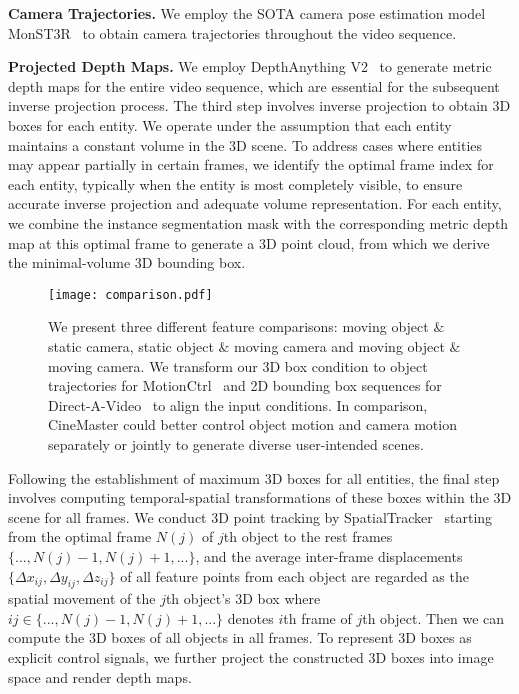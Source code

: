 \noindent\textbf{Camera Trajectories.} We employ the SOTA camera pose estimation model MonST3R~\cite{zhang2024monst3r} to obtain camera trajectories throughout the video sequence.

\noindent\textbf{Projected Depth Maps.} We employ DepthAnything V2~\cite{depth_anything_v2} to generate metric depth maps for the entire video sequence, which are essential for the subsequent inverse projection process. 
The third step involves inverse projection to obtain $3$D boxes for each entity. We operate under the assumption that each entity maintains a constant volume in the $3$D scene. To address cases where entities may appear partially in certain frames, we identify the optimal frame index for each entity, typically when the entity is most completely visible, to ensure accurate inverse projection and adequate volume representation. For each entity, we combine the instance segmentation mask with the corresponding metric depth map at this optimal frame to generate a $3$D point cloud, from which we derive the minimal-volume $3$D bounding box.


\begin{figure*}[!t]
  \centering
  \texttt{[image: comparison.pdf]}
  \vspace{-20pt}  
  \caption{We present three different feature comparisons: moving object $\&$ static camera, static object $\&$ moving camera and moving object $\&$ moving camera. We transform our 3D box condition to object trajectories for MotionCtrl~\cite{MotionCtrl} and 2D bounding box sequences for Direct-A-Video~\cite{yang2024direct} to align the input conditions. In comparison, CineMaster could better control object motion and camera motion separately or jointly to generate diverse user-intended scenes.}
  \label{fig:comparison}
  \vspace{-8pt}  
\end{figure*}



Following the establishment of maximum 
$3$D boxes for all entities, the final step involves computing temporal-spatial transformations of these boxes within the $3$D scene for all frames. 
We conduct 3D point tracking by SpatialTracker~\cite{SpatialTracker} starting from the optimal frame $N(j)$ of $j$th object to the rest frames $\{..., N(j)-1, N(j)+1, ...\}$, and the average inter-frame displacements $\{\Delta x_{ij}, \Delta y_{ij}, \Delta z_{ij}\}$ of all feature points from each object are regarded as the spatial movement of the $j$th object's 3D box where $ij\in\{..., N(j)-1, N(j)+1, ...\}$ denotes $i$th frame of $j$th object. Then we can compute the 3D boxes of all objects in all frames. To represent 3D boxes as explicit control signals, we further project the constructed 3D boxes into image space and render depth maps.
